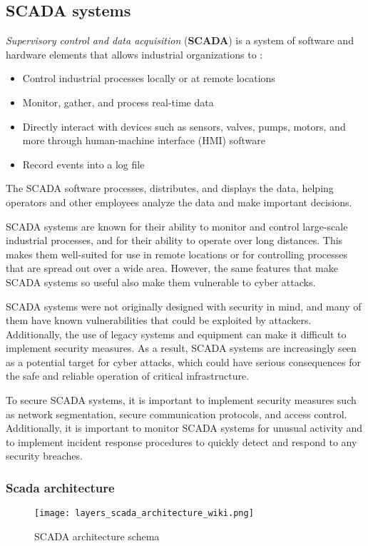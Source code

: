 \subsection{SCADA systems}
\textit{Supervisory control and data acquisition} (\textbf{SCADA}) is a system of software and hardware elements that allows industrial organizations to \cite{scada_definition}:
\begin{itemize}
	\item Control industrial processes locally or at remote locations
	\item Monitor, gather, and process real-time data
	\item Directly interact with devices such as sensors, valves, pumps, motors, and more through human-machine interface (HMI) software
	\item Record events into a log file
\end{itemize}

The SCADA software processes, distributes, and displays the data, helping operators and other employees analyze the data and make important decisions.

\bigskip
SCADA systems are known for their ability to monitor and control large-scale industrial processes, and for their ability to operate over long distances. This makes them well-suited for use in remote locations or for controlling processes that are spread out over a wide area. However, the same features that make SCADA systems so useful also make them vulnerable to cyber attacks.

SCADA systems were not originally designed with security in mind, and many of them have known vulnerabilities that could be exploited by attackers. Additionally, the use of legacy systems and equipment can make it difficult to implement security measures. As a result, SCADA systems are increasingly seen as a potential target for cyber attacks, which could have serious consequences for the safe and reliable operation of critical infrastructure.

To secure SCADA systems, it is important to implement security measures such as network segmentation, secure communication protocols, and access control. Additionally, it is important to monitor SCADA systems for unusual activity and to implement incident response procedures to quickly detect and respond to any security breaches.

\subsubsection{Scada architecture}
\begin{figure}[ht]
	\centering
	\texttt{[image: layers\_scada\_architecture\_wiki.png]}
	\caption{SCADA architecture schema}
	\label{fig:SCADA_schema}
\end{figure}

